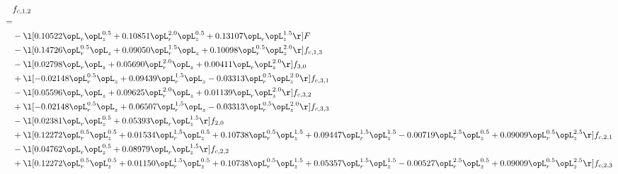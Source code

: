 \begin{alignat}{2} 
\label{eq:f_12_2} 
& f_{c,1,2} \nonumber \\ 
 = \\ 
& - \l[  0.10522 \opL_r \opL_z^{0.5} +  0.10851 \opL_r^{2.0} \opL_z^{0.5} +  0.13107 \opL_r \opL_z^{1.5}  \r] F \nonumber \\ 
& - \l[  0.14726 \opL_r^{0.5} \opL_z +  0.09050 \opL_r^{1.5} \opL_z +  0.10098 \opL_r^{0.5} \opL_z^{2.0}  \r] f_{c,1,3} \nonumber \\ 
& - \l[  0.02798 \opL_r \opL_z +  0.05690 \opL_r^{2.0} \opL_z +  0.00411 \opL_r \opL_z^{2.0}  \r] f_{3,0} \nonumber \\ 
& + \l[  -0.02148 \opL_r^{0.5} \opL_z +  0.09439 \opL_r^{1.5} \opL_z   -0.03313 \opL_r^{0.5} \opL_z^{2.0}  \r] f_{c,3,1} \nonumber \\ 
& - \l[  0.05596 \opL_r \opL_z +  0.09625 \opL_r^{2.0} \opL_z +  0.01139 \opL_r \opL_z^{2.0}  \r] f_{c,3,2} \nonumber \\ 
& + \l[  -0.02148 \opL_r^{0.5} \opL_z +  0.06507 \opL_r^{1.5} \opL_z   -0.03313 \opL_r^{0.5} \opL_z^{2.0}  \r] f_{c,3,3} \nonumber \\ 
& - \l[  0.02381 \opL_r \opL_z^{0.5} +  0.05393 \opL_r \opL_z^{1.5}  \r] f_{2,0} \nonumber \\ 
& + \l[  0.12272 \opL_r^{0.5} \opL_z^{0.5} +  0.01534 \opL_r^{1.5} \opL_z^{0.5} +  0.10738 \opL_r^{0.5} \opL_z^{1.5} +  0.09447 \opL_r^{1.5} \opL_z^{1.5}   -0.00719 \opL_r^{2.5} \opL_z^{0.5} +  0.09009 \opL_r^{0.5} \opL_z^{2.5}  \r] f_{c,2,1} \nonumber \\ 
& - \l[  0.04762 \opL_r \opL_z^{0.5} +  0.08979 \opL_r \opL_z^{1.5}  \r] f_{c,2,2} \nonumber \\ 
& + \l[  0.12272 \opL_r^{0.5} \opL_z^{0.5} +  0.01150 \opL_r^{1.5} \opL_z^{0.5} +  0.10738 \opL_r^{0.5} \opL_z^{1.5} +  0.05357 \opL_r^{1.5} \opL_z^{1.5}   -0.00527 \opL_r^{2.5} \opL_z^{0.5} +  0.09009 \opL_r^{0.5} \opL_z^{2.5}  \r] f_{c,2,3} \nonumber \\ 
\end{alignat} 


